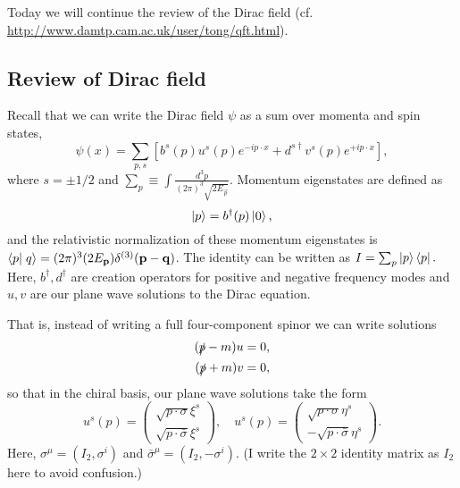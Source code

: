 Today we will continue the review of the Dirac field (cf. \href{David Tong's QFT notes}{http://www.damtp.cam.ac.uk/user/tong/qft.html}).

\subsection*{Review of Dirac field} Recall that we can write the Dirac field $\psi$ as a sum over momenta and spin states,
\begin{equation}
    \psi(x)=\sum_{p,s}\left[ b^s(p) u^s(p) e^{-ip\cdot x}+d^{s\dagger}v^s(p) e^{+ip\cdot x}\right],
\end{equation}
where $s=\pm 1/2$ and $\sum_p\equiv \int \frac{d^3p}{(2\pi)^3 \sqrt{2E_{\vec p}}}$. Momentum eigenstates are defined as
\begin{equation*}
    \left| p \right>=b^\dagger(p)\left| 0 \right>,
\end{equation*}
and the relativistic normalization of these momentum eigenstates is $\braket{p}{q}=(2\pi)^3 (2E_{\vec p})\delta^{(3)}(\vec p - \vec q)$. The identity can be written as $I=\sum_p \left| p \right>\left< p \right|.$ Here, $b^\dagger,d^\dagger$ are creation operators for positive and negative frequency modes and $u,v$ are our plane wave solutions to the Dirac equation.

That is, instead of writing a full four-component spinor we can write solutions
\begin{align*}
    (\slashed{p}-m)u &=0,\\
    (\slashed{p}+m)v &=0,
\end{align*}
so that in the chiral basis, our plane wave solutions take the form
\begin{equation}
    u^s(p) = \begin{pmatrix}
        \sqrt{p\cdot \sigma} \xi^s\\
        \sqrt{p\cdot \bar \sigma} \xi^s
    \end{pmatrix},
    \quad
    u^s(p) = \begin{pmatrix}
        \sqrt{p\cdot \sigma} \eta^s\\
        -\sqrt{p\cdot \bar \sigma} \eta^s
    \end{pmatrix}.
\end{equation}
Here, $\sigma^\mu=(I_2,\sigma^i)$ and $\bar \sigma^\mu=(I_2,-\sigma^i)$. (I write the $2\times 2$ identity matrix as $I_2$ here to avoid confusion.)

